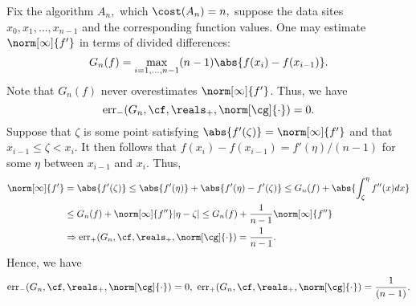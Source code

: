 Fix the algorithm $A_n,$ which $\cost(A_n)=n,$
suppose the data sites $x_0, x_1, \dots, x_{n-1}$ and the corresponding function values. One may estimate $\norm[\infty]{f'}$ in terms of divided differences:
\begin{equation} \label{estfirstderiv}
G_{n}(f)= \max_{i=1, \ldots, n-1} (n-1)\abs{f(x_i)-f(x_{i-1})}.
\end{equation}
Note that $G_n(f)$ never overestimates $\norm[\infty]{f'}$. Thus, we have
$$\err_{-}(G_n,\cf,\reals_{+},\norm[\cg]{\cdot})=0.$$
 Suppose that $\zeta$ is some point satisfying $\abs{f'(\zeta)} = \norm[\infty]{f'}$ and
that $x_{i-1}\le \zeta < x_i$.  It then follows that $f(x_i)-f(x_{i-1}) = f'(\eta)/(n-1)$ for some $\eta$ between $x_{i-1}$ and $x_i$.  Thus,
\begin{align*}
\norm[\infty]{f'} &= \abs{f'(\zeta)}\leq \abs{f'(\eta)} + \abs{f'(\eta)-f'(\zeta) }  \le G_{n}(f) + \abs{\int_\zeta^\eta f''(x)dx }\nonumber\\
& \leq  G_n(f) + \norm[\infty]{f''}|\eta-\zeta| \leq G_n(f)+ \frac{1}{n-1}\norm[\infty]{f''}\nonumber\\
&\Rightarrow \err_{+}(G_n,\cf,\reals_{+},\norm[\cg]{\cdot}) =\frac{1}{n-1}.
\end{align*}
Hence, we have
$$\err_{-}(G_n,\cf,\reals_{+},\norm[\cg]{\cdot})=0, \ \err_{+}(G_n,\cf,\reals_{+},\norm[\cg]{\cdot}) =\frac{1}{(n-1)}.
$$

